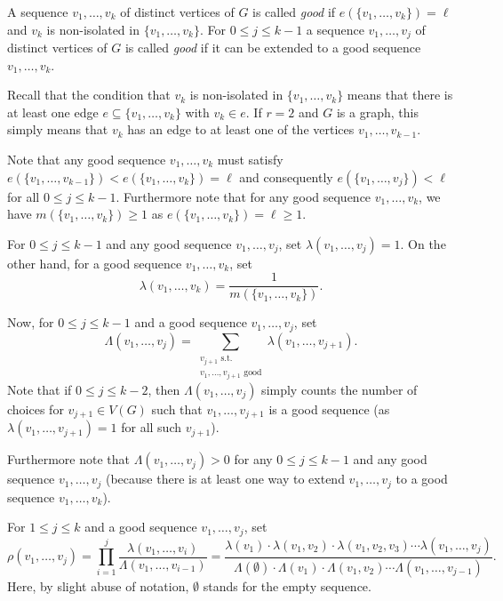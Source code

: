 \begin{definition}A sequence $v_1,\dots,v_k$ of distinct vertices of $G$ is called \emph{good} if $e(\lbrace v_1,\dots,v_k\rbrace)=\ell$ and $v_k$ is non-isolated in $\lbrace v_1,\dots,v_k\rbrace$. For $0\leq j\leq k-1$ a sequence $v_1,\dots,v_j$ of distinct vertices of $G$ is called \emph{good} if it can be extended to a good sequence $v_1,\dots,v_k$.
\end{definition}

Recall that the condition that $v_k$ is non-isolated in $\lbrace v_1,\dots,v_k\rbrace$ means that there is at least one edge $e\subseteq \lbrace v_1,\dots,v_k\rbrace$ with $v_k\in e$. If $r=2$ and $G$ is a graph, this simply means that $v_k$ has an edge to at least one of the vertices $v_1,\dots,v_{k-1}$.

Note that any good sequence $v_1,\dots,v_k$ must satisfy $e(\lbrace v_1,\dots,v_{k-1}\rbrace)<e(\lbrace v_1,\dots,v_{k}\rbrace)=\ell$ and consequently $e(\lbrace v_1,\dots,v_j\rbrace)<\ell$ for all $0\leq j\leq k-1$. Furthermore note that for any good sequence $v_1,\dots,v_k$, we have $m(\lbrace v_1,\dots,v_k\rbrace)\geq 1$ as $e(\lbrace v_1,\dots,v_k\rbrace)=\ell\geq 1$.

For $0\leq j\leq k-1$ and any good sequence $v_1,\dots,v_j$, set $\lambda(v_1,\dots,v_j)=1$. On the other hand, for a good sequence $v_1,\dots,v_k$, set
\[\lambda(v_1,\dots,v_k)=\frac{1}{m(\lbrace v_1,\dots,v_k\rbrace)}.\]

Now, for $0\leq j\leq k-1$ and a good sequence $v_1,\dots,v_j$, set
\[\Lambda(v_1,\dots,v_j)=\sum_{\substack{v_{j+1}\text{ s.t. }\\v_1,\dots,v_{j+1}\text{ good}}}\lambda(v_1,\dots,v_{j+1}).\]
Note that if $0\leq j\leq k-2$, then $\Lambda(v_1,\dots,v_j)$ simply counts the number of choices for $v_{j+1}\in V(G)$ such that $v_1,\dots,v_{j+1}$ is a good sequence (as $\lambda(v_1,\dots,v_{j+1})=1$ for all such $v_{j+1}$).

Furthermore note that $\Lambda(v_1,\dots,v_j)>0$ for any $0\leq j\leq k-1$ and any good sequence $v_1,\dots,v_j$ (because there is at least one way to extend $v_1,\dots,v_j$ to a good sequence $v_1,\dots,v_k$).

For $1\leq j\leq k$ and a good sequence $v_1,\dots,v_j$, set
\[\rho(v_1,\dots,v_j)=\prod_{i=1}^{j}\frac{\lambda(v_1,\dots,v_i)}{\Lambda(v_1,\dots,v_{i-1})}=\frac{\lambda(v_1)\cdot \lambda(v_1,v_2)\cdot \lambda(v_1,v_2,v_3)\dotsm \lambda(v_1,\dots,v_j)}{\Lambda(\emptyset)\cdot \Lambda(v_1)\cdot \Lambda(v_1, v_2)\dotsm \Lambda(v_1,\dots,v_{j-1})}.\]
Here, by slight abuse of notation, $\emptyset$ stands for the empty sequence.

